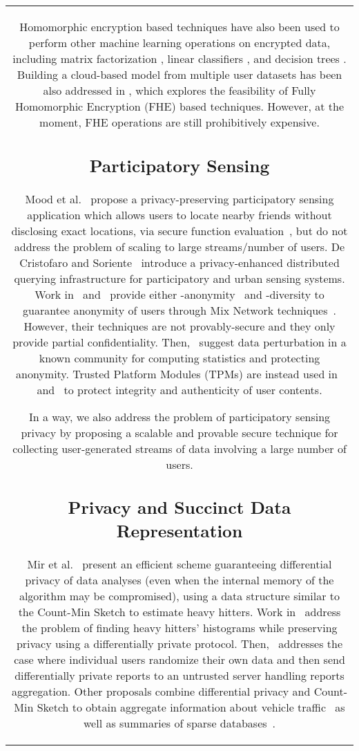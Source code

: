 \documentclass[conference]{IEEEtran}
\begin{document}
\begin{figure*}[ht!]
{\begin{tabular}{|c|}
Homomorphic encryption based techniques have also been used to perform other machine learning operations on encrypted data, including matrix factorization \cite{nikolaenko2013privacy}, linear classifiers \cite{bos2014private,graepel2013ml}, and decision trees \cite{bost2014machine}. 
Building a cloud-based model from multiple user datasets has been also addressed in \cite{lopez2012fly}, which explores the feasibility of Fully Homomorphic Encryption (FHE) based techniques.
However, at the moment, FHE operations are still prohibitively expensive. 




\subsection{Participatory Sensing}
Mood et al.~\cite{mood2014reuse} propose a privacy-preserving participatory sensing application which allows users to locate nearby friends without disclosing exact locations, via secure function evaluation~\cite{yao1982protocols}, but do not address the problem of scaling to large streams/number of users. De Cristofaro and Soriente~\cite{de2013extended} introduce a privacy-enhanced distributed querying infrastructure for participatory and urban sensing systems.
Work in~\cite{mobisys08} and~\cite{comcom} provide either -anonymity~\cite{k-anonymity} and -diversity \cite{l-diversity} to guarantee anonymity of users through Mix Network techniques~\cite{MixNet}. However, their techniques are not provably-secure and they only provide partial confidentiality.
Then,~\cite{ganti2008} suggest data perturbation in a known community for computing statistics and protecting anonymity.
Trusted Platform Modules (TPMs) are instead used in~\cite{gilbert2010} and~\cite{dua2009} to protect integrity and authenticity of user contents.

In a way, we also address the problem of participatory sensing privacy by proposing a scalable and provable secure technique for collecting user-generated streams of data involving a large number of users.


\subsection{Privacy and Succinct Data Representation}
Mir et al.~\cite{mir2011pan} present an efficient scheme guaranteeing differential privacy of data analyses (even when the internal memory of the algorithm may be compromised), using a data structure similar to the Count-Min Sketch to estimate heavy hitters. 
Work in~\cite{hsu2012distributed, chan2012differentially} address the problem of finding heavy hitters' histograms while preserving privacy using 
a differentially private protocol. 
Then,~\cite{bassilylocal} addresses the case where individual users randomize their own data and then send differentially private reports to an untrusted server handling reports aggregation.  
Other proposals combine differential privacy and Count-Min Sketch to obtain aggregate information about vehicle traffic~\cite{Monreale2013} as well as summaries of sparse databases~\cite{cormode2012differentially}.



\end{tabular}}
\end{figure*}
\end{document}
